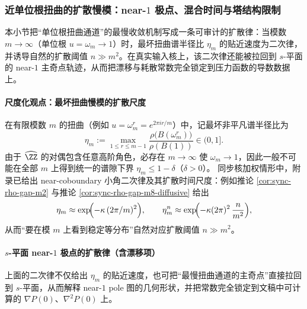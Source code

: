 \subsubsection{近单位根扭曲的扩散慢模：near-\texorpdfstring{$1$}{1} 极点、混合时间与塔结构限制}\label{subsec:xi-near1-diffusive}
本小节把“单位根扭曲通道”的最慢收敛机制写成一条可审计的扩散律：当模数 \(m\to\infty\)（单位根 \(u=\omega_m\to 1\)）时，最坏扭曲谱半径比 \(\eta_m\) 的贴近速度为二次律，并诱导自然的扩散阈值 \(n\gg m^2\)。在真实输入核上，该二次律还能被拉回到 \(s\)-平面的 near-\(1\) 主奇点轨迹，从而把漂移与耗散常数完全锁定到压力函数的导数数据上。

\paragraph{尺度化观点：最坏扭曲慢模的扩散尺度}
在有限模数 \(m\) 的扭曲（例如 \(u=\omega_m^r=e^{2\pi ir/m}\)）中，记最坏非平凡谱半径比为
\[
\eta_m:=\max_{1\le r\le m-1}\frac{\rho\bigl(B(\omega_m^r)\bigr)}{\rho(B(1))}\in(0,1].
\]
由于 \(\widehat{\ZZ}\) 的对偶包含任意高阶角色，必存在 \(m\to\infty\) 使 \(\omega_m\to 1\)，因此一般不可能在全部 \(m\) 上得到统一的谱隙下界 \(\eta_m\le 1-\delta\)（\(\delta>0\)）。
同步核加权情形中，附录已给出 near-coboundary 小角二次律及其扩散时间尺度：例如推论 \ref{cor:sync-rho-gap-m2} 与推论 \ref{cor:sync-rho-gap-m8-diffusive} 给出
\[
\eta_m\approx \exp\!\Bigl(-\kappa\,(2\pi/m)^2\Bigr),
\qquad
\eta_m^n\approx \exp\!\Bigl(-\kappa(2\pi)^2\,\frac{n}{m^2}\Bigr),
\]
从而“要在模 \(m\) 上看到稳定等分布”自然对应扩散阈值 \(n\gg m^2\)。

\paragraph{\texorpdfstring{$s$}{s}-平面 near-\texorpdfstring{$1$}{1} 极点的扩散律（含漂移项）}
上面的二次律不仅给出 \(\eta_m\) 的贴近速度，也可把“最慢扭曲通道的主奇点”直接拉回到
\(s\)-平面，从而解释 near-\(1\) pole 图的几何形状，并把常数完全锁定到文稿中可计算的
\(\nabla P(0)\)、\(\nabla^2P(0)\) 上。

